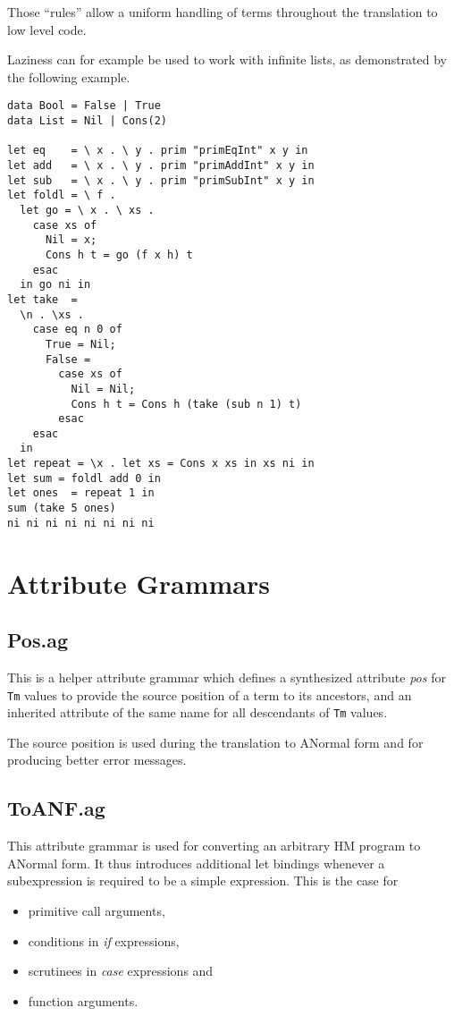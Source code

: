 \documentclass{scrartcl}
\begin{document}
Those ``rules'' allow a uniform handling of terms throughout the translation to low level code.

Laziness can for example be used to work with infinite lists, as demonstrated by the following example.

\begin{lstlisting}
data Bool = False | True
data List = Nil | Cons(2)

let eq    = \ x . \ y . prim "primEqInt" x y in
let add   = \ x . \ y . prim "primAddInt" x y in
let sub   = \ x . \ y . prim "primSubInt" x y in
let foldl = \ f .
  let go = \ x . \ xs .
    case xs of
      Nil = x;
      Cons h t = go (f x h) t
    esac
  in go ni in
let take  = 
  \n . \xs .
    case eq n 0 of
      True = Nil;
      False = 
        case xs of
          Nil = Nil;
          Cons h t = Cons h (take (sub n 1) t)
        esac
    esac
  in
let repeat = \x . let xs = Cons x xs in xs ni in
let sum = foldl add 0 in
let ones  = repeat 1 in
sum (take 5 ones)
ni ni ni ni ni ni ni ni
\end{lstlisting}

\section{Attribute Grammars}

\subsection{Pos.ag}

This is a helper attribute grammar which defines a synthesized attribute \emph{pos} for \lstinline|Tm| values to provide the source position of a term to its ancestors, and an inherited attribute of the same name for all descendants of \lstinline|Tm| values.

The source position is used during the translation to ANormal form and for producing better error messages.

\subsection{ToANF.ag}

This attribute grammar is used for converting an arbitrary HM program to ANormal form. It thus introduces additional let bindings whenever a subexpression is required to be a simple expression. This is the case for

\begin{itemize}
\item primitive call arguments,
\item conditions in \emph{if} expressions,
\item scrutinees in \emph{case} expressions and
\item function arguments.
\end{itemize}
\end{document}
